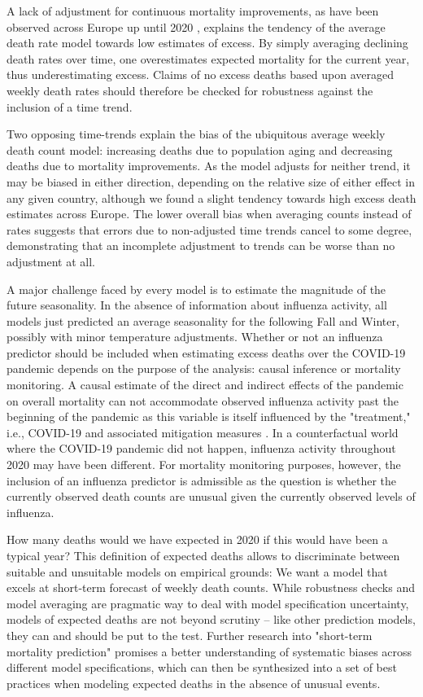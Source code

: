 \documentclass[12pt]{article}
\begin{document}
A lack of adjustment for continuous mortality improvements, as have been observed across Europe up until 2020 \citep{Leon2011, Aburto2021a}, explains the tendency of the average death rate model towards low estimates of excess. By simply averaging declining death rates over time, one overestimates expected mortality for the current year, thus underestimating excess. Claims of no excess deaths based upon averaged weekly death rates should therefore be checked for robustness against the inclusion of a time trend.

Two opposing time-trends explain the bias of the ubiquitous average weekly death count model: increasing deaths due to population aging and decreasing deaths due to mortality improvements. As the model adjusts for neither trend, it may be biased in either direction, depending on the relative size of either effect in any given country, although we found a slight tendency towards high excess death estimates across Europe. The lower overall bias when averaging counts instead of rates suggests that errors due to non-adjusted time trends cancel to some degree, demonstrating that an incomplete adjustment to trends can be worse than no adjustment at all.

A major challenge faced by every model is to estimate the magnitude of the future seasonality. In the absence of information about influenza activity, all models just predicted an average seasonality for the following Fall and Winter, possibly with minor temperature adjustments. Whether or not an influenza predictor should be included when estimating excess deaths over the COVID-19 pandemic depends on the purpose of the analysis: causal inference or mortality monitoring. A causal estimate of the direct and indirect effects of the pandemic on overall mortality can not accommodate observed influenza activity past the beginning of the pandemic as this variable is itself influenced by the "treatment," i.e., COVID-19 and associated mitigation measures \cite{Cowling2020, Soo2020}. In a counterfactual world where the COVID-19 pandemic did not happen, influenza activity throughout 2020 may have been different. For mortality monitoring purposes, however, the inclusion of an influenza predictor is admissible as the question is whether the currently observed death counts are unusual given the currently observed levels of influenza.

How many deaths would we have expected in 2020 if this would have been a typical year? This definition of expected deaths allows to discriminate between suitable and unsuitable models on empirical grounds: We want a model that excels at short-term forecast of weekly death counts. While robustness checks and model averaging are pragmatic way to deal with model specification uncertainty, models of expected deaths are not beyond scrutiny -- like other prediction models, they can and should be put to the test. Further research into "short-term mortality prediction" promises a better understanding of systematic biases across different model specifications, which can then be synthesized into a set of best practices when modeling expected deaths in the absence of unusual events.
\end{document}
